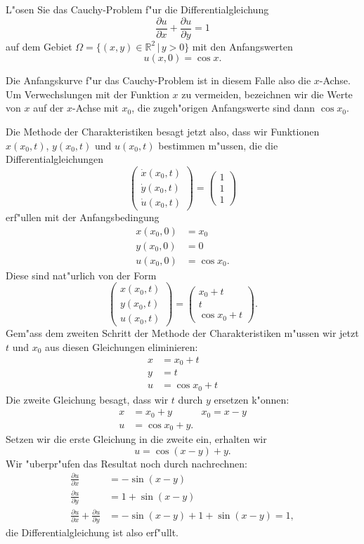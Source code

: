 L"osen Sie das Cauchy-Problem f"ur die Differentialgleichung
\[
\frac{\partial u}{\partial x}
+
\frac{\partial u}{\partial y}
=1
\]
auf dem Gebiet $\Omega = \{ (x,y)\in\mathbb R^2\,|\, y > 0\}$
mit den Anfangswerten
\[
u(x,0)=\cos x.
\]

\begin{loesung}
Die Anfangskurve f"ur das Cauchy-Problem ist in diesem Falle also die
$x$-Achse. Um Verwechslungen mit der Funktion $x$ zu vermeiden, bezeichnen
wir die Werte von $x$ auf der $x$-Achse mit $x_0$, die zugeh"origen
Anfangswerte sind dann $\cos x_0$. 

Die Methode der Charakteristiken besagt jetzt also, dass wir Funktionen
$x(x_0, t)$, $y(x_0,t)$ und $u(x_0,t)$ bestimmen m"ussen, die die
Differentialgleichungen
\[
\begin{pmatrix}
\dot x(x_0,t)\\
\dot y(x_0,t)\\
\dot u(x_0,t)
\end{pmatrix}
=\begin{pmatrix}
1\\1\\1
\end{pmatrix}
\]
erf"ullen mit der Anfangsbedingung
\begin{align*}
x(x_0,0)&=x_0\\
y(x_0,0)&=0\\
u(x_0,0)&=\cos x_0.
\end{align*}
Diese sind nat"urlich von der Form
\[
\begin{pmatrix}
x(x_0,t)\\
y(x_0,t)\\
u(x_0,t)
\end{pmatrix}
=
\begin{pmatrix}
x_0+t\\
t\\
\cos x_0 + t
\end{pmatrix}.
\]
Gem"ass dem zweiten Schritt der Methode der Charakteristiken m"ussen
wir jetzt $t$ und $x_0$ aus diesen Gleichungen eliminieren:
\begin{align*}
x&=x_0+t\\
y&=t\\
u&=\cos x_0 + t
\end{align*}
Die zweite Gleichung besagt, dass wir $t$ durch $y$ ersetzen k"onnen:
\begin{align*}
x&=x_0+y&x_0=x-y\\
u&=\cos x_0 + y.
\end{align*}
Setzen wir die erste Gleichung in die zweite ein, erhalten wir
\[
u=\cos(x-y)+y.
\]
Wir "uberpr"ufen das Resultat noch durch nachrechnen:
\begin{align*}
\frac{\partial u}{\partial x}
&=
-\sin(x-y)
\\
\frac{\partial u}{\partial y}
&=
1+\sin(x-y)
\\
\frac{\partial u}{\partial x}
+
\frac{\partial u}{\partial y}
&=
-\sin(x-y)
+
1+\sin(x-y)
=1,
\end{align*}
die Differentialgleichung ist also erf"ullt.
\end{loesung}

